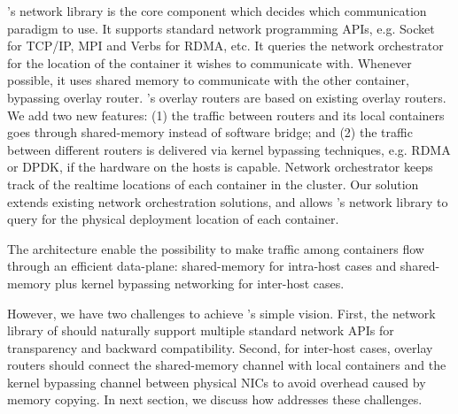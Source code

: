 \sysname's network library is the core component which decides which
communication paradigm to use. It supports standard network programming APIs,
e.g. Socket for TCP/IP, MPI and Verbs for RDMA, etc. It queries the network
orchestrator for the location of the container it wishes to communicate with.
Whenever possible, it uses shared memory to communicate with the other
container, bypassing overlay router.  \sysname's overlay routers are based on
existing overlay routers. We add two new features: (1) the traffic between
routers and its local containers goes through shared-memory instead of software
bridge; and (2) the traffic between different routers is delivered via kernel
bypassing techniques, e.g. RDMA or DPDK, if the hardware on the hosts is
capable.  Network orchestrator keeps track of the realtime locations of each
container in the cluster. Our solution extends existing network orchestration
solutions, and allows \sysname's network library to query for the physical
deployment location of each container. 

The architecture enable the possibility to make traffic among containers flow
through an efficient data-plane: shared-memory for intra-host cases and
shared-memory plus kernel bypassing networking for inter-host cases.

However, we have two challenges to achieve \sysname's simple vision.  First, the
network library of \sysname should naturally support multiple standard network
APIs for transparency and backward compatibility. Second, for inter-host cases,
overlay routers should connect the shared-memory channel with local containers
and the kernel bypassing channel between physical NICs to avoid overhead caused
by memory copying. In next section, we discuss how \sysname addresses these
challenges.
